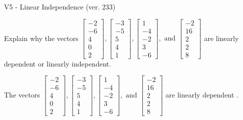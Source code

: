 \begin{exercise}
  \begin{exerciseTitle}V5 - Linear Independence (ver. 233)\end{exerciseTitle}
  \begin{exerciseStatement}
    Explain why the vectors \(\left[\begin{array}{r}
-2 \\
-6 \\
4 \\
0 \\
2
\end{array}\right] , \left[\begin{array}{r}
-3 \\
-5 \\
5 \\
4 \\
1
\end{array}\right] , \left[\begin{array}{r}
1 \\
-4 \\
-2 \\
3 \\
-6
\end{array}\right] , \text{ and } \left[\begin{array}{r}
-2 \\
16 \\
2 \\
2 \\
8
\end{array}\right]\) are linearly dependent or linearly independent.	


  \end{exerciseStatement}
  \begin{exerciseAnswer}
   The vectors \(\left[\begin{array}{r}
-2 \\
-6 \\
4 \\
0 \\
2
\end{array}\right] , \left[\begin{array}{r}
-3 \\
-5 \\
5 \\
4 \\
1
\end{array}\right] , \left[\begin{array}{r}
1 \\
-4 \\
-2 \\
3 \\
-6
\end{array}\right] , \text{ and } \left[\begin{array}{r}
-2 \\
16 \\
2 \\
2 \\
8
\end{array}\right]\) are 
  	 linearly dependent  .
  


  \end{exerciseAnswer}
\end{exercise}